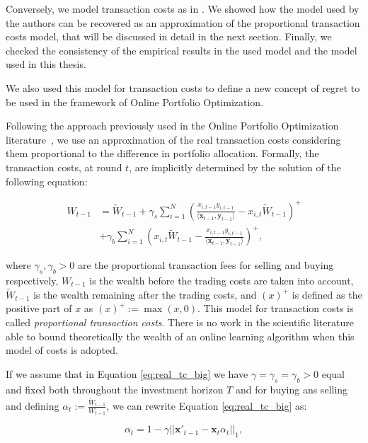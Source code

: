 Conversely, we model transaction costs as in \cite{das2013online}. We showed how the model used by the authors can be recovered as an approximation of the proportional transaction costs model, that will be discussed in detail in the next section. Finally, we checked the consistency of the empirical results in the used model and the model used in this thesis.

We also used this model for transaction costs to define a new concept of regret to be used in the framework of Online Portfolio Optimization.

Following the approach previously used in the Online Portfolio Optimization literature~\cite{blum1999universal}, we use an approximation of the real transaction costs considering them proportional to the difference in portfolio allocation.
Formally, the transaction costs, at round $t$, are implicitly determined by the solution of the following equation:

\begin{align}\label{eq:real_tc_big}
W_{t-1}&=\tilde W_{t-1}+\gamma_s\sum\limits_{i=1}^N\left(\frac{x_{i,t-1}y_{i,t-1}}{\langle \mathbf x_{t-1},\mathbf y_{t-1}\rangle}-x_{i,t}\tilde W_{t-1}\right)^+\\\nonumber
&+\gamma_b\sum\limits_{i=1}^N\left(x_{i,t}\tilde W_{t-1}-\frac{x_{i,t-1}y_{i,t-1}}{\langle \mathbf x_{t-1},\mathbf y_{t-1}\rangle}\right)^+,
\end{align}

where $\gamma_s,\gamma_b>0$ are the proportional transaction fees for selling and buying respectively, $W_{t-1}$ is the wealth before the trading costs are taken into account, $\tilde W_{t-1}$ is the wealth remaining after the trading costs, and $(x)^+$ is defined as the positive part of $x$ as $(x)^+:=\max(x,0)$.
This model for transaction costs is called \emph{proportional transaction costs}. There is no work in the scientific literature able to bound theoretically the wealth of an online learning algorithm when this model of costs is adopted.

If we assume that in Equation \eqref{eq:real_tc_big} we have $\gamma=\gamma_s=\gamma_b>0$ equal and fixed both throughout the investment horizon $T$ and for buying ans selling and defining $\alpha_t:=\frac{\tilde W_{t-1}}{W_{t-1}}$, we can rewrite Equation \eqref{eq:real_tc_big} as:

\begin{equation}\label{eq:real_tc}
   \alpha_t = 1 - \gamma ||\mathbf{x}'_{t-1}-\mathbf{x}_t \alpha_{t} ||_1,
\end{equation}

